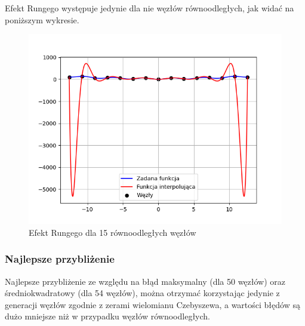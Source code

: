 \documentclass{article}
\begin{document}
Efekt Rungego występuje jedynie dla nie węzłów równoodległych, jak widać na poniższym wykresie.

\begin{figure}[H]
\centering
  \begin{minipage}[b]{0.49\textwidth}
    \includegraphics[width=\textwidth]{img07.png}
    \caption{Efekt Rungego dla 15 równoodległych węzłów}
  \end{minipage}
\end{figure}

\subsubsection{Najlepsze przybliżenie}

Najlepsze przybliżenie ze względu na błąd maksymalny (dla 50 węzłów) oraz średniokwadratowy (dla 54 węzłów), można otrzymać korzystając jedynie z generacji węzłów zgodnie z zerami wielomianu Czebyszewa, a wartości błędów są dużo mniejsze niż w przypadku węzłów równoodległych.
\end{document}
